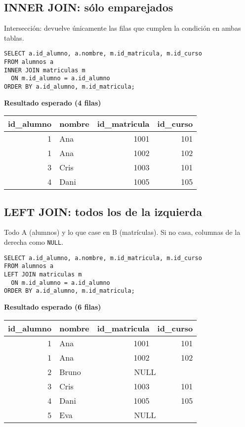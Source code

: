 \documentclass[11pt,a4paper]{article}
\begin{document}
\subsection{INNER JOIN: sólo emparejados}
\begin{tcolorbox}[title=Idea]
Intersección: devuelve únicamente las filas que cumplen la condición en ambas tablas.
\end{tcolorbox}

\begin{lstlisting}
SELECT a.id_alumno, a.nombre, m.id_matricula, m.id_curso
FROM alumnos a
INNER JOIN matriculas m
  ON m.id_alumno = a.id_alumno
ORDER BY a.id_alumno, m.id_matricula;
\end{lstlisting}

\textbf{Resultado esperado (4 filas)}
\begin{center}
\begin{tabular}{r l r r}
\toprule
id\_alumno & nombre & id\_matricula & id\_curso \\
\midrule
1 & Ana  & 1001 & 101 \\
1 & Ana  & 1002 & 102 \\
3 & Cris & 1003 & 101 \\
4 & Dani & 1005 & 105 \\
\bottomrule
\end{tabular}
\end{center}

\subsection{LEFT JOIN: todos los de la izquierda}
\begin{tcolorbox}[title=Idea]
Todo A (alumnos) y lo que case en B (matrículas). Si no casa, columnas de la derecha como \texttt{NULL}.
\end{tcolorbox}

\begin{lstlisting}
SELECT a.id_alumno, a.nombre, m.id_matricula, m.id_curso
FROM alumnos a
LEFT JOIN matriculas m
  ON m.id_alumno = a.id_alumno
ORDER BY a.id_alumno, m.id_matricula;
\end{lstlisting}

\textbf{Resultado esperado (6 filas)}
\begin{center}
\begin{tabular}{r l r r}
\toprule
id\_alumno & nombre & id\_matricula & id\_curso \\
\midrule
1 & Ana   & 1001 & 101 \\
1 & Ana   & 1002 & 102 \\
2 & Bruno & \multicolumn{2}{c}{NULL} \\
3 & Cris  & 1003 & 101 \\
4 & Dani  & 1005 & 105 \\
5 & Eva   & \multicolumn{2}{c}{NULL} \\
\bottomrule
\end{tabular}
\end{center}
\end{document}
